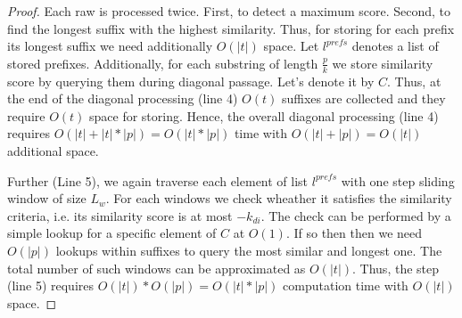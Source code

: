 \begin{proof}
Each raw is processed twice.
First, to detect a maximum score.
Second, to find the longest suffix with the highest similarity.
Thus, for storing for each prefix its longest suffix we need additionally $O(|t|)$ space.
Let $l^{prefs}$ denotes a list of stored prefixes.
Additionally, for each substring of length $\frac{p}{k}$ we store similarity score by querying them during diagonal passage.
Let's denote it by $C$.
Thus, at the end of the diagonal processing (line 4) $O(t)$ suffixes are collected and they require $O(t)$ space for storing.
Hence, the overall diagonal processing (line 4) requires $O(|t|+|t|*|p|) = O(|t|*|p|)$ time with $O(|t|+|p|) = O(|t|)$ additional space.

Further (Line 5), we again traverse each element of list $l^{prefs}$ with one step sliding window of size $L_w$.
For each windows we check wheather it satisfies the similarity criteria, i.e. its similarity score is at most $-k_{di}$.
The check can be performed by a simple lookup for a specific element of $C$ at $O(1)$.
If so then then we need $O(|p|)$ lookups within suffixes to query the most similar and longest one.
The total number of such windows can be approximated as $O(|t|)$.
Thus, the step (line 5) requires $O(|t|)*O(|p|) = O(|t|*|p|)$ computation time with $O(|t|)$ space.


\end{proof}
